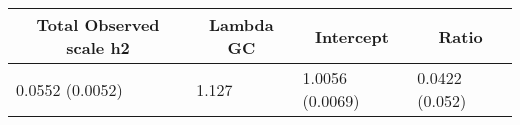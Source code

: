 \begin{center}
\begin{tabular}{llll}
\hline\hline
\multicolumn{1}{c}{Total Observed scale h2}&\multicolumn{1}{c}{Lambda GC}&\multicolumn{1}{c}{Intercept}&\multicolumn{1}{c}{Ratio}\tabularnewline
\hline
0.0552 (0.0052)&1.127&1.0056 (0.0069)&0.0422 (0.052)\tabularnewline
\hline
\end{tabular}\end{center}
